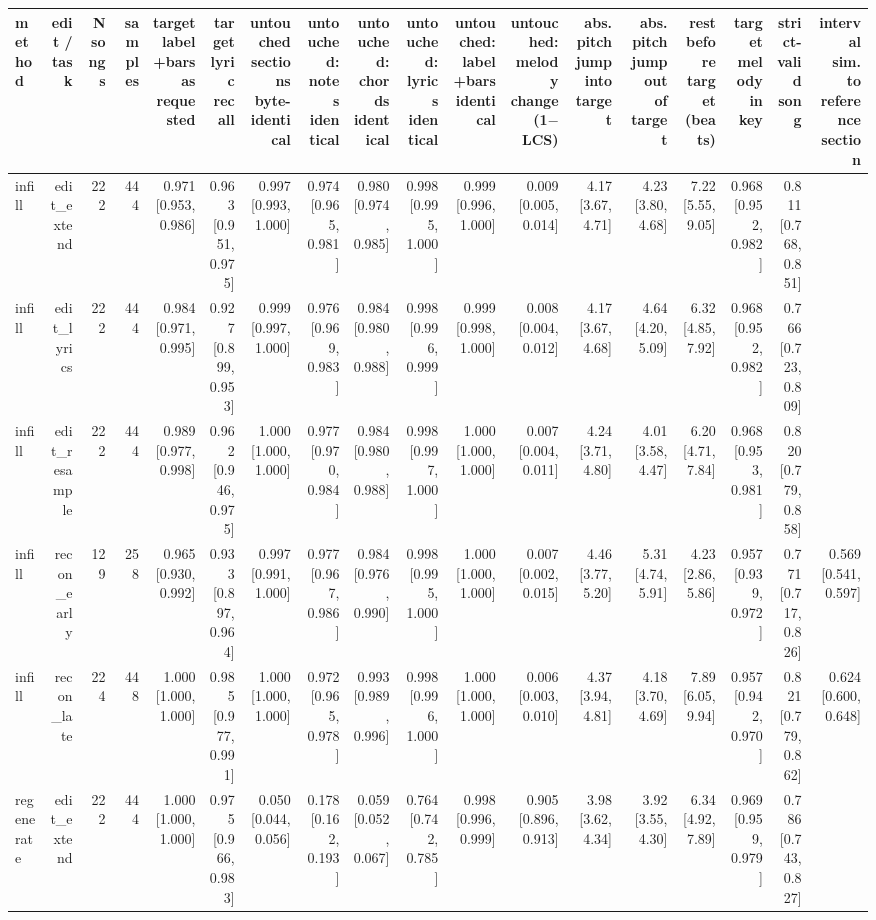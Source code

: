 \begin{table}[t]
\centering
\small
\begin{tabular}{lrrrrrrrrrrrrrrrrr}
\toprule
method & edit / task & N songs & samples & target label+bars as requested & target lyric recall & untouched sections byte-identical & untouched: notes identical & untouched: chords identical & untouched: lyrics identical & untouched: label+bars identical & untouched: melody change (1$-$LCS) & abs. pitch jump into target & abs. pitch jump out of target & rest before target (beats) & target melody in key & strict-valid song & interval sim. to reference section \\
\midrule
infill & edit\_extend & 222 & 444 & 0.971 [0.953, 0.986] & 0.963 [0.951, 0.975] & 0.997 [0.993, 1.000] & 0.974 [0.965, 0.981] & 0.980 [0.974, 0.985] & 0.998 [0.995, 1.000] & 0.999 [0.996, 1.000] & 0.009 [0.005, 0.014] & 4.17 [3.67, 4.71] & 4.23 [3.80, 4.68] & 7.22 [5.55, 9.05] & 0.968 [0.952, 0.982] & 0.811 [0.768, 0.851] &  \\
infill & edit\_lyrics & 222 & 444 & 0.984 [0.971, 0.995] & 0.927 [0.899, 0.953] & 0.999 [0.997, 1.000] & 0.976 [0.969, 0.983] & 0.984 [0.980, 0.988] & 0.998 [0.996, 0.999] & 0.999 [0.998, 1.000] & 0.008 [0.004, 0.012] & 4.17 [3.67, 4.68] & 4.64 [4.20, 5.09] & 6.32 [4.85, 7.92] & 0.968 [0.952, 0.982] & 0.766 [0.723, 0.809] &  \\
infill & edit\_resample & 222 & 444 & 0.989 [0.977, 0.998] & 0.962 [0.946, 0.975] & 1.000 [1.000, 1.000] & 0.977 [0.970, 0.984] & 0.984 [0.980, 0.988] & 0.998 [0.997, 1.000] & 1.000 [1.000, 1.000] & 0.007 [0.004, 0.011] & 4.24 [3.71, 4.80] & 4.01 [3.58, 4.47] & 6.20 [4.71, 7.84] & 0.968 [0.953, 0.981] & 0.820 [0.779, 0.858] &  \\
infill & recon\_early & 129 & 258 & 0.965 [0.930, 0.992] & 0.933 [0.897, 0.964] & 0.997 [0.991, 1.000] & 0.977 [0.967, 0.986] & 0.984 [0.976, 0.990] & 0.998 [0.995, 1.000] & 1.000 [1.000, 1.000] & 0.007 [0.002, 0.015] & 4.46 [3.77, 5.20] & 5.31 [4.74, 5.91] & 4.23 [2.86, 5.86] & 0.957 [0.939, 0.972] & 0.771 [0.717, 0.826] & 0.569 [0.541, 0.597] \\
infill & recon\_late & 224 & 448 & 1.000 [1.000, 1.000] & 0.985 [0.977, 0.991] & 1.000 [1.000, 1.000] & 0.972 [0.965, 0.978] & 0.993 [0.989, 0.996] & 0.998 [0.996, 1.000] & 1.000 [1.000, 1.000] & 0.006 [0.003, 0.010] & 4.37 [3.94, 4.81] & 4.18 [3.70, 4.69] & 7.89 [6.05, 9.94] & 0.957 [0.942, 0.970] & 0.821 [0.779, 0.862] & 0.624 [0.600, 0.648] \\
regenerate & edit\_extend & 222 & 444 & 1.000 [1.000, 1.000] & 0.975 [0.966, 0.983] & 0.050 [0.044, 0.056] & 0.178 [0.162, 0.193] & 0.059 [0.052, 0.067] & 0.764 [0.742, 0.785] & 0.998 [0.996, 0.999] & 0.905 [0.896, 0.913] & 3.98 [3.62, 4.34] & 3.92 [3.55, 4.30] & 6.34 [4.92, 7.89] & 0.969 [0.959, 0.979] & 0.786 [0.743, 0.827] &  \\

\end{tabular}
\end{table}
